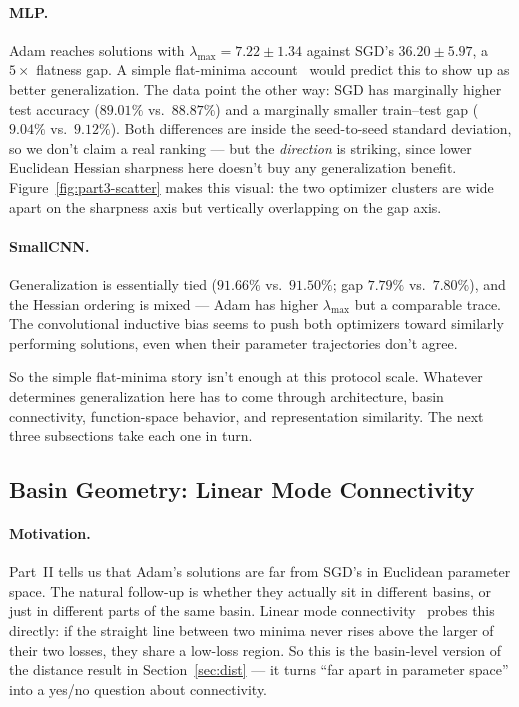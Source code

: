 \documentclass[11pt]{article}
\begin{document}
\paragraph{MLP.}
Adam reaches solutions with $\lambda_{\max}=7.22\pm 1.34$ against SGD's $36.20\pm 5.97$, a $5\times$ flatness gap. A simple flat-minima account~\cite{hochreiter1997flat,keskar2017large} would predict this to show up as better generalization. The data point the other way: SGD has marginally higher test accuracy ($89.01\%$ vs.\ $88.87\%$) and a marginally smaller train--test gap ($9.04\%$ vs.\ $9.12\%$). Both differences are inside the seed-to-seed standard deviation, so we don't claim a real ranking --- but the \emph{direction} is striking, since lower Euclidean Hessian sharpness here doesn't buy any generalization benefit. Figure~\ref{fig:part3-scatter} makes this visual: the two optimizer clusters are wide apart on the sharpness axis but vertically overlapping on the gap axis.

\paragraph{SmallCNN.}
Generalization is essentially tied ($91.66\%$ vs.\ $91.50\%$; gap $7.79\%$ vs.\ $7.80\%$), and the Hessian ordering is mixed --- Adam has higher $\lambda_{\max}$ but a comparable trace. The convolutional inductive bias seems to push both optimizers toward similarly performing solutions, even when their parameter trajectories don't agree.

So the simple flat-minima story isn't enough at this protocol scale. Whatever determines generalization here has to come through architecture, basin connectivity, function-space behavior, and representation similarity. The next three subsections take each one in turn.

\FloatBarrier

\subsection{Basin Geometry: Linear Mode Connectivity}
\label{sec:mode-connectivity}

\paragraph{Motivation.} Part~II tells us that Adam's solutions are far from SGD's in Euclidean parameter space. The natural follow-up is whether they actually sit in different basins, or just in different parts of the same basin. Linear mode connectivity~\cite{garipov2018loss,frankle2020linear} probes this directly: if the straight line between two minima never rises above the larger of their two losses, they share a low-loss region. So this is the basin-level version of the distance result in Section~\ref{sec:dist} --- it turns ``far apart in parameter space'' into a yes/no question about connectivity.
\end{document}
